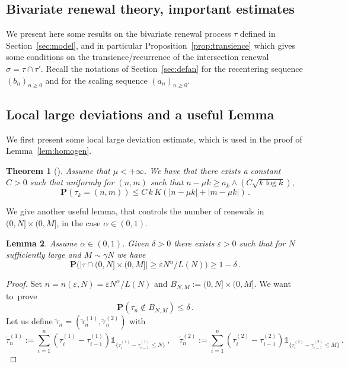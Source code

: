 \documentclass[10pt]{amsart}
\newtheorem{theo}{Theorem}[section]
\newtheorem{lemm}[theo]{Lemma}\newtheorem{prop}[theo]{Proposition}\newtheorem{coro}[theo]{Corollary}\newtheorem{conj}[theo]{Conjecture}
\theoremstyle{definition}\newtheorem{defi}[theo]{Definition}\newtheorem{rema}[theo]{Remark}\newtheorem{exam}[theo]{Example}\newtheorem{exem}[theo]{Example}\newtheorem{nota}[theo]{Notation}
\newcommand{\ga}{\alpha}
\newcommand{\gep}{\varepsilon}
\newcommand{\unbf}%
{\mathds{1}}
\renewcommand{\tilde}{\widetilde}
\newcommand{\bP}{\ensuremath{\mathbf{P}}}
\begin{document}
\begin{appendix}
\section{Bivariate renewal theory, important estimates}\label{app:bivrenewal}

We present here some results on the bivariate renewal process $\tau$ defined in Section~\ref{sec:model}, and in particular Proposition~\ref{prop:transience} which gives some conditions on the transience/recurrence of the intersection renewal $\sigma=\tau\cap\tau'$. Recall the notations of Section~\ref{sec:defan} for the recentering sequence $(b_n)_{n\geq 0}$ and for the scaling sequence $(a_n)_{n\geq 0}$.


\subsection{Local large deviations and a useful Lemma}

We first present some local large deviation estimate, which is used in the proof of Lemma~\ref{lem:homogen}.

\begin{theo}[{\cite[Theorem~2.4]{cf:B}}]\label{thm:locallargedev}
Assume that $\mu<+\infty$. We have that there exists a constant $C>0$ such that uniformly for $(n,m)$ such that $n - \mu k \geq a_k \wedge (C\sqrt{k\log k}),$
\[
\bP(\tau_k =(n,m)) \leq C\,k\,K(|n-\mu k| + |m-\mu k|)\,.
\]
\end{theo}

We give another useful lemma, that controls the number of renewals in $(0,N]\times(0,M]$, in the case $\ga\in(0,1)$.

\begin{lemm}\label{th:limp}
Assume $\ga\in(0,1)$. Given $\delta>0$ there exists $\gep>0$ such that for $N$ sufficiently large and $M \sim \gamma N$ we have
\begin{equation}
\bP \big(\vert \tau \cap (0,N] \times (0,M] \vert \ge \gep N^{\ga}/L(N) \big) \ge 1- \delta\,.
\end{equation}
\end{lemm}

\begin{proof}
Set $n = n(\gep,N) = \gep N^{\ga}/L(N)$ and $B_{N,M} := (0,N]\times (0,M]$. We want to~prove
\begin{equation}
\bP \left(\tau_n \notin B_{N,M} \right) \le \delta\,.
\end{equation}
Let us define $\tilde \tau_n = (\tilde \tau_n^{(1)},\tilde \tau_n^{(2)})$ with
\begin{equation}
\tilde{\tau}^{(1)}_n := \sum_{i=1}^n (\tau_i^{(1)} - \tau_{i-1}^{(1)}) \unbf_{ \lbrace \tau_i^{(1)} - \tau_{i-1}^{(1)} \le N \rbrace}\,,\quad
\tilde{\tau}^{(2)}_n := \sum_{i=1}^n (\tau_i^{(2)} - \tau_{i-1}^{(2)}) \unbf_{ \lbrace \tau_i^{(2)} - \tau_{i-1}^{(2)} \le M \rbrace}\,.
\end{equation}


\end{proof}
\end{appendix}
\end{document}
